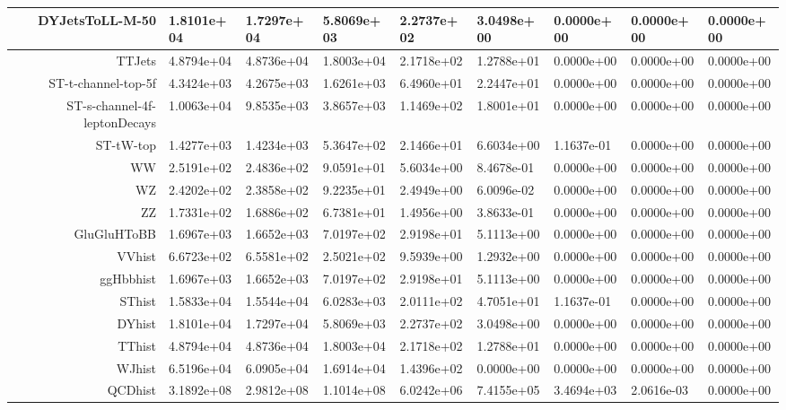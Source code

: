 \documentclass{article}
\begin{document}
\begin{adjustbox}{angle=90}
\begin{tabular}{rllllllll}
 \hline 
DYJetsToLL-M-50&1.8101e+04&1.7297e+04&5.8069e+03&2.2737e+02&3.0498e+00&0.0000e+00&0.0000e+00&0.0000e+00 \\
 \hline 
TTJets&4.8794e+04&4.8736e+04&1.8003e+04&2.1718e+02&1.2788e+01&0.0000e+00&0.0000e+00&0.0000e+00 \\
 \hline 
ST-t-channel-top-5f&4.3424e+03&4.2675e+03&1.6261e+03&6.4960e+01&2.2447e+01&0.0000e+00&0.0000e+00&0.0000e+00 \\
 \hline 
ST-s-channel-4f-leptonDecays&1.0063e+04&9.8535e+03&3.8657e+03&1.1469e+02&1.8001e+01&0.0000e+00&0.0000e+00&0.0000e+00 \\
 \hline 
ST-tW-top&1.4277e+03&1.4234e+03&5.3647e+02&2.1466e+01&6.6034e+00&1.1637e-01&0.0000e+00&0.0000e+00 \\
 \hline 
WW&2.5191e+02&2.4836e+02&9.0591e+01&5.6034e+00&8.4678e-01&0.0000e+00&0.0000e+00&0.0000e+00 \\
 \hline 
WZ&2.4202e+02&2.3858e+02&9.2235e+01&2.4949e+00&6.0096e-02&0.0000e+00&0.0000e+00&0.0000e+00 \\
 \hline 
ZZ&1.7331e+02&1.6886e+02&6.7381e+01&1.4956e+00&3.8633e-01&0.0000e+00&0.0000e+00&0.0000e+00 \\
 \hline 
GluGluHToBB&1.6967e+03&1.6652e+03&7.0197e+02&2.9198e+01&5.1113e+00&0.0000e+00&0.0000e+00&0.0000e+00 \\
 \hline 
VVhist&6.6723e+02&6.5581e+02&2.5021e+02&9.5939e+00&1.2932e+00&0.0000e+00&0.0000e+00&0.0000e+00 \\
 \hline 
ggHbbhist&1.6967e+03&1.6652e+03&7.0197e+02&2.9198e+01&5.1113e+00&0.0000e+00&0.0000e+00&0.0000e+00 \\
 \hline 
SThist&1.5833e+04&1.5544e+04&6.0283e+03&2.0111e+02&4.7051e+01&1.1637e-01&0.0000e+00&0.0000e+00 \\
 \hline 
DYhist&1.8101e+04&1.7297e+04&5.8069e+03&2.2737e+02&3.0498e+00&0.0000e+00&0.0000e+00&0.0000e+00 \\
 \hline 
TThist&4.8794e+04&4.8736e+04&1.8003e+04&2.1718e+02&1.2788e+01&0.0000e+00&0.0000e+00&0.0000e+00 \\
 \hline 
WJhist&6.5196e+04&6.0905e+04&1.6914e+04&1.4396e+02&0.0000e+00&0.0000e+00&0.0000e+00&0.0000e+00 \\
 \hline 
QCDhist&3.1892e+08&2.9812e+08&1.1014e+08&6.0242e+06&7.4155e+05&3.4694e+03&2.0616e-03&0.0000e+00 \\
\end{tabular}

\end{adjustbox}
\end{document}
